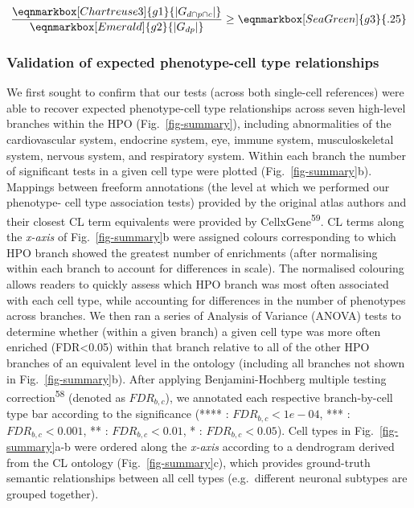 \documentclass[
]{article}
\begin{document}
\hfill\break

\begin{equation*}
  \frac{
     \eqnmarkbox[Chartreuse3]{g1}{|G_{d \cap p \cap c} |}
    }{
       \eqnmarkbox[Emerald]{g2}{|G_{dp}|}} 
  \geq \eqnmarkbox[SeaGreen]{g3}{.25} 
\end{equation*}

\hfill\break
\hfill\break

\subsubsection{Validation of expected phenotype-cell type
relationships}\label{validation-of-expected-phenotype-cell-type-relationships-1}

We first sought to confirm that our tests (across both single-cell
references) were able to recover expected phenotype-cell type
relationships across seven high-level branches within the HPO
(Fig.~\ref{fig-summary}), including abnormalities of the cardiovascular
system, endocrine system, eye, immune system, musculoskeletal system,
nervous system, and respiratory system. Within each branch the number of
significant tests in a given cell type were plotted
(Fig.~\ref{fig-summary}b). Mappings between freeform annotations (the
level at which we performed our phenotype- cell type association tests)
provided by the original atlas authors and their closest CL term
equivalents were provided by CellxGene\textsuperscript{59}. CL terms
along the \emph{x-axis} of Fig.~\ref{fig-summary}b were assigned colours
corresponding to which HPO branch showed the greatest number of
enrichments (after normalising within each branch to account for
differences in scale). The normalised colouring allows readers to
quickly assess which HPO branch was most often associated with each cell
type, while accounting for differences in the number of phenotypes
across branches. We then ran a series of Analysis of Variance (ANOVA)
tests to determine whether (within a given branch) a given cell type was
more often enriched (FDR\textless0.05) within that branch relative to
all of the other HPO branches of an equivalent level in the ontology
(including all branches not shown in Fig.~\ref{fig-summary}b). After
applying Benjamini-Hochberg multiple testing
correction\textsuperscript{58} (denoted as \(FDR _{b,c}\)), we annotated
each respective branch-by-cell type bar according to the significance
(**** : \(FDR _{b,c}<1e-04\), *** : \(FDR _{b,c}<0.001\), ** :
\(FDR _{b,c}<0.01\), * : \(FDR _{b,c}<0.05\)). Cell types in
Fig.~\ref{fig-summary}a-b were ordered along the \emph{x-axis} according
to a dendrogram derived from the CL ontology (Fig.~\ref{fig-summary}c),
which provides ground-truth semantic relationships between all cell
types (e.g.~different neuronal subtypes are grouped together).
\end{document}
